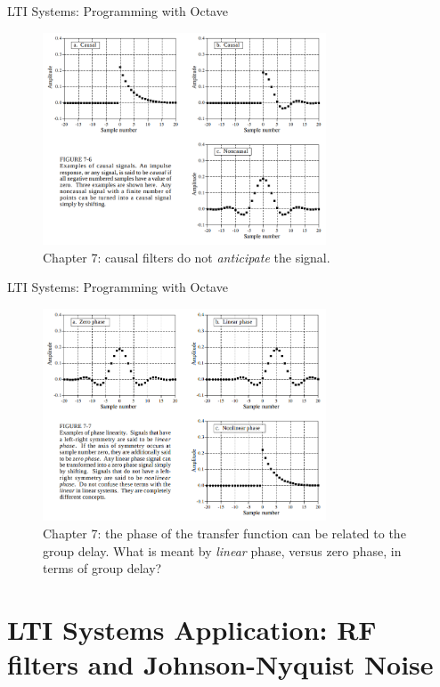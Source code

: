 \documentclass{beamer}
\begin{document}
\begin{frame}[fragile]{LTI Systems: Programming with Octave}
\small
\begin{figure}
\centering
\includegraphics[width=0.75\textwidth]{figures/kernel3.png}
\caption{\label{fig:kernel3} Chapter 7: causal filters do not \textit{anticipate} the signal.}
\end{figure}
\end{frame}

\begin{frame}[fragile]{LTI Systems: Programming with Octave}
\small
\begin{figure}
\centering
\includegraphics[width=0.75\textwidth]{figures/kernel4.png}
\caption{\label{fig:kernel4} Chapter 7: the phase of the transfer function can be related to the group delay.  What is meant by \textit{linear} phase, versus zero phase, in terms of group delay?}
\end{figure}
\end{frame}

\section{LTI Systems Application: RF filters and Johnson-Nyquist Noise}
\end{document}
